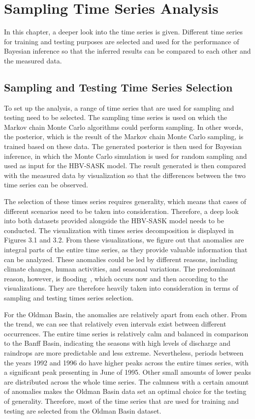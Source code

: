\chapter{Sampling Time Series Analysis}
In this chapter, a deeper look into the time series is given. Different time series for training and testing purposes are selected and used for the performance of Bayesian inference so that the inferred results can be compared to each other and the measured data. 

\section{Sampling and Testing Time Series Selection}
To set up the analysis, a range of time series that are used for sampling and testing need to be selected. The sampling time series is used on which the Markov chain Monte Carlo algorithms could perform sampling. In other words, the posterior, which is the result of the Markov chain Monte Carlo sampling, is trained based on these data. The generated posterior is then used for Bayesian inference, in which the Monte Carlo simulation is used for random sampling and used as input for the HBV-SASK model. The result generated is then compared with the measured data by visualization so that the differences between the two time series can be observed.

The selection of these times series requires generality, which means that cases of different scenarios need to be taken into consideration. Therefore, a deep look into both datasets provided alongside the HBV-SASK model needs to be conducted. The visualization with times series decomposition is displayed in Figures 3.1 and 3.2. From these visualizations, we figure out that anomalies are integral parts of the entire time series, as they provide valuable information that can be analyzed. These anomalies could be led by different reasons, including climate changes, human activities, and seasonal variations. The predominant reason, however, is flooding~\cite{hbv_sask_anomalies_cause}, which occurs now and then according to the visualizations. They are therefore heavily taken into consideration in terms of sampling and testing times series selection.

For the Oldman Basin, the anomalies are relatively apart from each other. From the trend, we can see that relatively even intervals exist between different occurrences. The entire time series is relatively calm and balanced in comparison to the Banff Basin, indicating the seasons with high levels of discharge and raindrops are more predictable and less extreme. Nevertheless, periods between the years 1992 and 1996 do have higher peaks across the entire times series, with a significant peak presenting in June of 1995. Other small amounts of lower peaks are distributed across the whole time series. The calmness with a certain amount of anomalies makes the Oldman Basin data set an optimal choice for the testing of generality. Therefore, most of the time series that are used for training and testing are selected from the Oldman Basin dataset.

